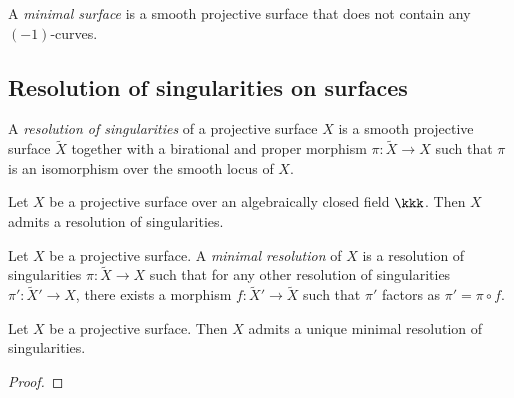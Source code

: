    \begin{definition}\label{def:minimal_surface}
        A \emph{minimal surface} is a smooth projective surface that does not contain any \((-1)\)-curves.
    \end{definition}

\subsection{Resolution of singularities on surfaces}

    \begin{definition}\label{def:resolution_of_singularities}
        A \emph{resolution of singularities} of a projective surface \(X\) is a smooth projective surface \(\widetilde{X}\) together with a birational and proper morphism \(\pi:\widetilde{X}\to X\) such that \(\pi\) is an isomorphism over the smooth locus of \(X\).
    \end{definition}

    \begin{theorem}\label{thm:resolution_of_singularities_on_surfaces}
        Let \(X\) be a projective surface over an algebraically closed field \(\kkk\).
        Then \(X\) admits a resolution of singularities.
    \end{theorem}

    \begin{definition}\label{def:minimal_resolution}
        Let \(X\) be a projective surface.
        A \emph{minimal resolution} of \(X\) is a resolution of singularities \(\pi:\widetilde{X}\to X\) such that for any other resolution of singularities \(\pi':\widetilde{X}'\to X\), there exists a morphism \(f:\widetilde{X}'\to \widetilde{X}\) such that \(\pi'\) factors as \(\pi' = \pi \circ f\).
    \end{definition}

    \begin{proposition}\label{prop:minimal_resolution_on_surfaces}
        Let \(X\) be a projective surface.
        Then \(X\) admits a unique minimal resolution of singularities.
    \end{proposition}
    \begin{proof}
    \end{proof}
